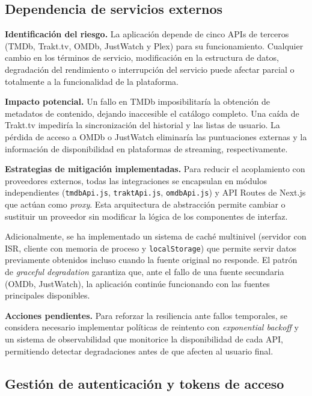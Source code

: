 \subsection{Dependencia de servicios externos}

\textbf{Identificación del riesgo.} La aplicación depende de cinco APIs de terceros (TMDb, Trakt.tv, OMDb, JustWatch y Plex) para su funcionamiento. Cualquier cambio en los términos de servicio, modificación en la estructura de datos, degradación del rendimiento o interrupción del servicio puede afectar parcial o totalmente a la funcionalidad de la plataforma.

\textbf{Impacto potencial.} Un fallo en TMDb imposibilitaría la obtención de metadatos de contenido, dejando inaccesible el catálogo completo. Una caída de Trakt.tv impediría la sincronización del historial y las listas de usuario. La pérdida de acceso a OMDb o JustWatch eliminaría las puntuaciones externas y la información de disponibilidad en plataformas de streaming, respectivamente.

\textbf{Estrategias de mitigación implementadas.} Para reducir el acoplamiento con proveedores externos, todas las integraciones se encapsulan en módulos independientes (\texttt{tmdbApi.js}, \texttt{traktApi.js}, \texttt{omdbApi.js}) y API Routes de Next.js que actúan como \textit{proxy}. Esta arquitectura de abstracción permite cambiar o sustituir un proveedor sin modificar la lógica de los componentes de interfaz.

Adicionalmente, se ha implementado un sistema de caché multinivel (servidor con ISR, cliente con memoria de proceso y \texttt{localStorage}) que permite servir datos previamente obtenidos incluso cuando la fuente original no responde. El patrón de \textit{graceful degradation} garantiza que, ante el fallo de una fuente secundaria (OMDb, JustWatch), la aplicación continúe funcionando con las fuentes principales disponibles.

\textbf{Acciones pendientes.} Para reforzar la resiliencia ante fallos temporales, se considera necesario implementar políticas de reintento con \textit{exponential backoff} y un sistema de observabilidad que monitorice la disponibilidad de cada API, permitiendo detectar degradaciones antes de que afecten al usuario final.

\subsection{Gestión de autenticación y tokens de acceso}


